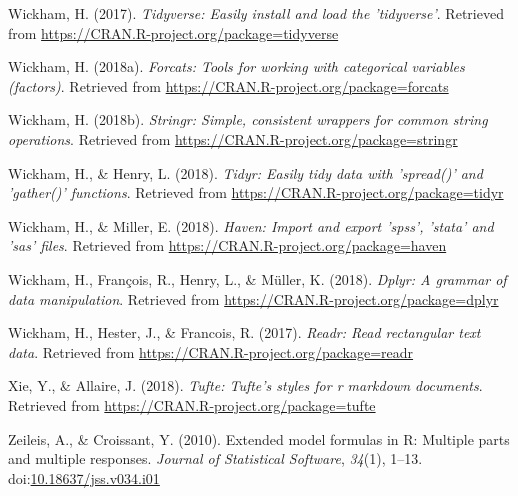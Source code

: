 \documentclass[english,man]{apa6}
\theoremstyle{definition}
\theoremstyle{definition}
\theoremstyle{definition}
\theoremstyle{remark}
\begin{document}
\hypertarget{ref-R-tidyverse}{}
Wickham, H. (2017). \emph{Tidyverse: Easily install and load the
'tidyverse'}. Retrieved from
\url{https://CRAN.R-project.org/package=tidyverse}

\hypertarget{ref-R-forcats}{}
Wickham, H. (2018a). \emph{Forcats: Tools for working with categorical
variables (factors)}. Retrieved from
\url{https://CRAN.R-project.org/package=forcats}

\hypertarget{ref-R-stringr}{}
Wickham, H. (2018b). \emph{Stringr: Simple, consistent wrappers for
common string operations}. Retrieved from
\url{https://CRAN.R-project.org/package=stringr}

\hypertarget{ref-R-tidyr}{}
Wickham, H., \& Henry, L. (2018). \emph{Tidyr: Easily tidy data with
'spread()' and 'gather()' functions}. Retrieved from
\url{https://CRAN.R-project.org/package=tidyr}

\hypertarget{ref-R-haven}{}
Wickham, H., \& Miller, E. (2018). \emph{Haven: Import and export
'spss', 'stata' and 'sas' files}. Retrieved from
\url{https://CRAN.R-project.org/package=haven}

\hypertarget{ref-R-dplyr}{}
Wickham, H., François, R., Henry, L., \& Müller, K. (2018). \emph{Dplyr:
A grammar of data manipulation}. Retrieved from
\url{https://CRAN.R-project.org/package=dplyr}

\hypertarget{ref-R-readr}{}
Wickham, H., Hester, J., \& Francois, R. (2017). \emph{Readr: Read
rectangular text data}. Retrieved from
\url{https://CRAN.R-project.org/package=readr}

\hypertarget{ref-R-tufte}{}
Xie, Y., \& Allaire, J. (2018). \emph{Tufte: Tufte's styles for r
markdown documents}. Retrieved from
\url{https://CRAN.R-project.org/package=tufte}

\hypertarget{ref-R-Formula}{}
Zeileis, A., \& Croissant, Y. (2010). Extended model formulas in R:
Multiple parts and multiple responses. \emph{Journal of Statistical
Software}, \emph{34}(1), 1--13.
doi:\href{https://doi.org/10.18637/jss.v034.i01}{10.18637/jss.v034.i01}
\end{document}
